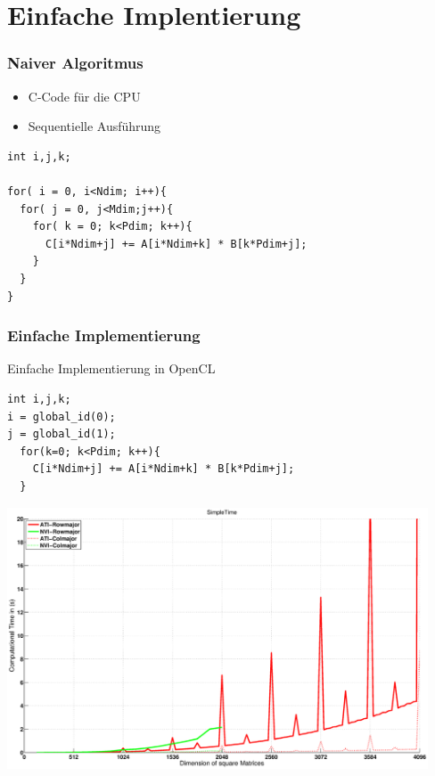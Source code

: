 \documentclass{beamer}
\begin{document}
\section{Einfache Implentierung}



\begin{frame}[fragile]
\frametitle{Naiver Algoritmus}

\begin{itemize}
\item C-Code f\"ur die CPU 
\item Sequentielle Ausf\"uhrung
\end{itemize}

\begin{lstlisting}[style=customc,caption=Matrixmultiplication in C]
int i,j,k;

for( i = 0, i<Ndim; i++){
  for( j = 0, j<Mdim;j++){
    for( k = 0; k<Pdim; k++){
      C[i*Ndim+j] += A[i*Ndim+k] * B[k*Pdim+j]; 
    }
  }
}
\end{lstlisting}



\end{frame}



\begin{frame}[fragile]
\frametitle{Einfache Implementierung}
 
Einfache Implementierung in OpenCL
\begin{lstlisting}[style=customc,caption=Einfachster Code in OpenCL]
int i,j,k;
i = global_id(0);
j = global_id(1);
  for(k=0; k<Pdim; k++){
    C[i*Ndim+j] += A[i*Ndim+k] * B[k*Pdim+j]; 
  }
\end{lstlisting}


\end{frame}

\begin{frame}

\begin{center}
\includegraphics[width=12.5cm]{SimpleTime}
\end{center}

	
\end{frame}
\end{document}
